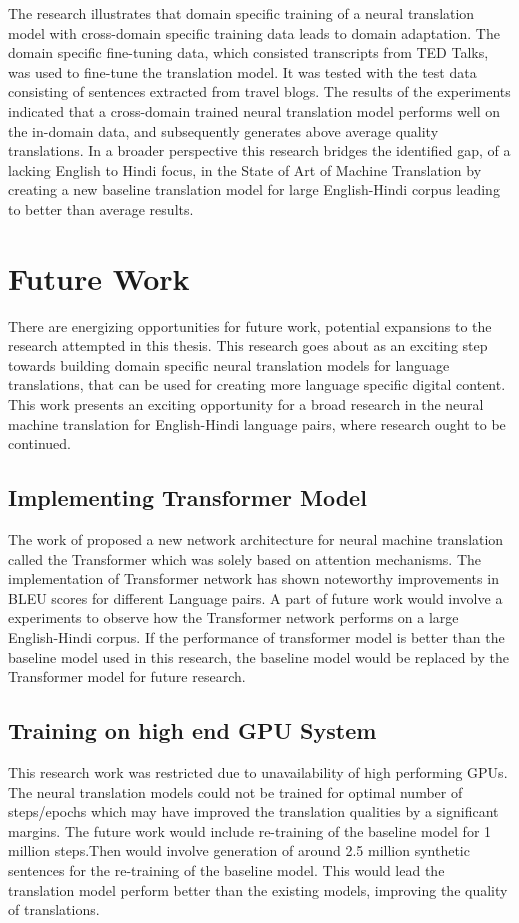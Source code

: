 The research illustrates that domain specific training of a neural translation model with cross-domain specific training data leads to domain adaptation. The domain specific fine-tuning data, which consisted transcripts from TED Talks, was used to fine-tune the translation model. It was tested with the test data consisting of sentences extracted from travel blogs. The results of the experiments indicated that a cross-domain trained neural translation model performs well on the in-domain data, and subsequently generates above average quality translations. In a broader perspective this research bridges the identified gap, of a lacking English to Hindi focus, in the State of Art of Machine Translation by creating a new baseline translation model for large English-Hindi corpus leading to better than average results.

\section{Future Work}
There are energizing opportunities for future work, potential expansions to the research attempted in this thesis. This research goes about as an exciting step towards building domain specific neural translation models for language translations, that can be used for creating more language specific digital content. This work presents an exciting opportunity for  a broad research in the neural machine translation for English-Hindi language pairs, where research ought to be continued.

\subsection{Implementing Transformer Model}
The work of \cite{DBLP:journals/corr/VaswaniSPUJGKP17} proposed a new network architecture for neural machine translation called the Transformer which was solely based on attention mechanisms. The implementation of Transformer network has shown noteworthy improvements in BLEU scores for different Language pairs. A part of future work would involve a experiments to observe how the Transformer network performs on a large English-Hindi corpus. If the performance of transformer model is better than the baseline model used in this research, the baseline model would be replaced by the Transformer model for future research. 

\subsection{Training on high end GPU System}
This research work was restricted due to unavailability of high performing GPUs. The neural translation models could not be trained for optimal number of steps/epochs which may have improved the translation qualities by a significant margins. The future work would include re-training of the baseline model for 1 million steps.Then would involve generation of around 2.5 million synthetic sentences for the re-training of the baseline model. This would lead the translation model perform better than the existing models, improving the quality of translations. 
